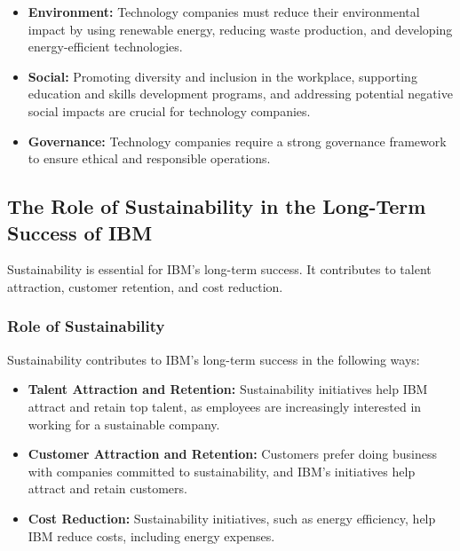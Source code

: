 \begin{itemize}
    \item \textbf{Environment:} Technology companies must reduce their environmental impact by using renewable energy, reducing waste production, and developing energy-efficient technologies.
    \item \textbf{Social:} Promoting diversity and inclusion in the workplace, supporting education and skills development programs, and addressing potential negative social impacts are crucial for technology companies.
    \item \textbf{Governance:} Technology companies require a strong governance framework to ensure ethical and responsible operations.
\end{itemize}

\subsection{The Role of Sustainability in the Long-Term Success of IBM}

Sustainability is essential for IBM's long-term success. It contributes to talent attraction, customer retention, and cost reduction.

\subsubsection{Role of Sustainability}

Sustainability contributes to IBM's long-term success in the following ways:

\begin{itemize}
    \item \textbf{Talent Attraction and Retention:} Sustainability initiatives help IBM attract and retain top talent, as employees are increasingly interested in working for a sustainable company.
    \item \textbf{Customer Attraction and Retention:} Customers prefer doing business with companies committed to sustainability, and IBM's initiatives help attract and retain customers.
    \item \textbf{Cost Reduction:} Sustainability initiatives, such as energy efficiency, help IBM reduce costs, including energy expenses.
\end{itemize}


